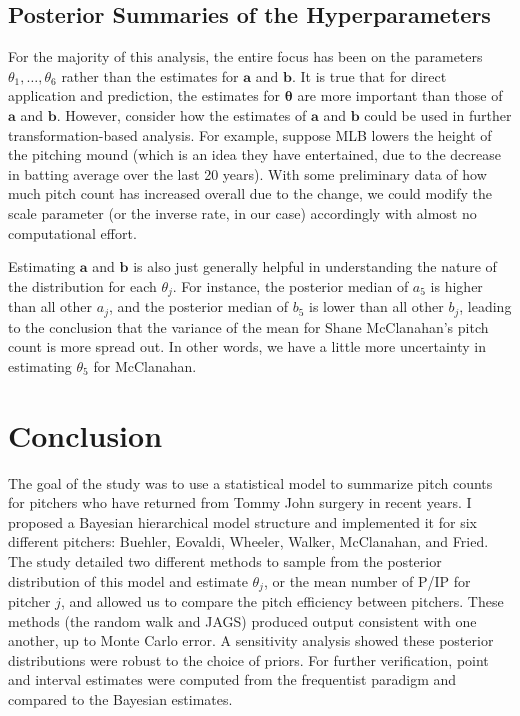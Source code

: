\documentclass{article}
\begin{document}
\subsection{Posterior Summaries of the Hyperparameters}

For the majority of this analysis, the entire focus has been on the parameters $\theta_1, \hdots, \theta_6$ rather than the estimates for $\mathbf{a}$ and $\mathbf{b}$. It is true that for direct application and prediction, the estimates for $\boldsymbol{\theta}$ are more important than those of $\mathbf{a}$ and $\mathbf{b}$. However, consider how the estimates of $\mathbf{a}$ and $\mathbf{b}$ could be used in further transformation-based analysis. For example, suppose MLB lowers the height of the pitching mound (which is an idea they have entertained, due to the decrease in batting average over the last 20 years). With some preliminary data of how much pitch count has increased overall due to the change, we could  modify the scale parameter (or the inverse rate, in our case) accordingly with almost no computational effort. 

Estimating $\mathbf{a}$ and $\mathbf{b}$ is also just generally helpful in understanding the nature of the distribution for each $\theta_j$. For instance, the posterior median of $a_5$ is higher than all other $a_j$, and the posterior median of $b_5$ is lower than all other $b_j$, leading to the conclusion that the variance of the mean for Shane McClanahan's pitch count is more spread out. In other words, we have a little more uncertainty in estimating $\theta_5$ for McClanahan.


\section{Conclusion}

The goal of the study was to use a statistical model to summarize pitch counts for pitchers who have returned from Tommy John surgery in recent years. I proposed a Bayesian hierarchical model structure and implemented it for six different pitchers: Buehler, Eovaldi, Wheeler, Walker, McClanahan, and Fried. The study detailed two different methods to sample from the posterior distribution of this model and estimate $\theta_j$, or the mean number of P/IP for pitcher $j$, and allowed us to compare the pitch efficiency between pitchers. These methods (the random walk and JAGS) produced output consistent with one another, up to Monte Carlo error. A sensitivity analysis showed these posterior distributions were robust to the choice of priors. For further verification, point and interval estimates were computed from the frequentist paradigm and compared to the Bayesian estimates.
\end{document}
